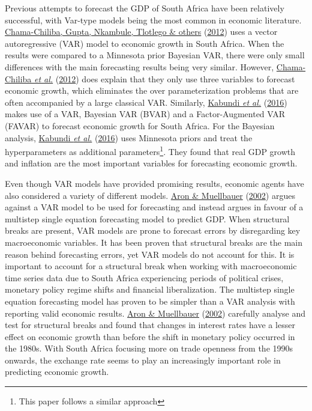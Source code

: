 \documentclass[11pt,preprint, authoryear]{elsarticle}
\numberwithin{equation}{section}
\numberwithin{figure}{section}
\numberwithin{table}{section}
\let\rmarkdownfootnote\footnote%
\def\footnote{\protect\rmarkdownfootnote}
\begin{document}
Previous attempts to forecast the GDP of South Africa have been
relatively successful, with Var-type models being the most common in
economic literature. \protect\hyperlink{ref-chama}{Chama-Chiliba, Gupta,
Nkambule, Tlotlego \& others} (\protect\hyperlink{ref-chama}{2012}) uses
a vector autoregressive (VAR) model to economic growth in South Africa.
When the results were compared to a Minnesota prior Bayesian VAR, there
were only small differences with the main forecasting results being very
similar. However, \protect\hyperlink{ref-chama}{Chama-Chiliba \emph{et
al.}} (\protect\hyperlink{ref-chama}{2012}) does explain that they only
use three variables to forecast economic growth, which eliminates the
over parameterization problems that are often accompanied by a large
classical VAR. Similarly, \protect\hyperlink{ref-kabundi}{Kabundi
\emph{et al.}} (\protect\hyperlink{ref-kabundi}{2016}) makes use of a
VAR, Bayesian VAR (BVAR) and a Factor-Augmented VAR (FAVAR) to forecast
economic growth for South Africa. For the Bayesian analysis,
\protect\hyperlink{ref-kabundi}{Kabundi \emph{et al.}}
(\protect\hyperlink{ref-kabundi}{2016}) uses Minnesota priors and treat
the hyperparameters as additional
parameters\footnote{This paper follows a similar approach}. They found
that real GDP growth and inflation are the most important variables for
forecasting economic growth.

Even though VAR models have provided promising results, economic agents
have also considered a variety of different models.
\protect\hyperlink{ref-aron2002}{Aron \& Muellbauer}
(\protect\hyperlink{ref-aron2002}{2002}) argues against a VAR model to
be used for forecasting and instead argues in favour of a multistep
single equation forecasting model to predict GDP. When structural breaks
are present, VAR models are prone to forecast errors by disregarding key
macroeconomic variables. It has been proven that structural breaks are
the main reason behind forecasting errors, yet VAR models do not account
for this. It is important to account for a structural break when working
with macroeconomic time series data due to South Africa experiencing
periods of political crises, monetary policy regime shifts and financial
liberalization. The multistep single equation forecasting model has
proven to be simpler than a VAR analysis with reporting valid economic
results. \protect\hyperlink{ref-aron2002}{Aron \& Muellbauer}
(\protect\hyperlink{ref-aron2002}{2002}) carefully analyse and test for
structural breaks and found that changes in interest rates have a lesser
effect on economic growth than before the shift in monetary policy
occurred in the 1980s. With South Africa focusing more on trade openness
from the 1990s onwards, the exchange rate seems to play an increasingly
important role in predicting economic growth.
\end{document}
